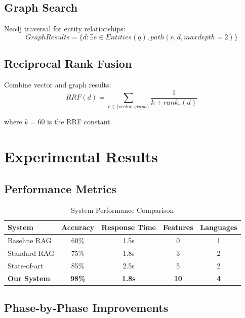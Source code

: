 \documentclass[12pt,a4paper]{article}
\begin{document}
\subsection{Graph Search}
Neo4j traversal for entity relationships:
\begin{equation}
GraphResults = \{d : \exists e \in Entities(q), path(e, d, maxdepth=2)\}
\end{equation}

\subsection{Reciprocal Rank Fusion}
Combine vector and graph results:
\begin{equation}
RRF(d) = \sum_{r \in \{vector, graph\}} \frac{1}{k + rank_r(d)}
\end{equation}

where $k=60$ is the RRF constant.


\section{Experimental Results}

\subsection{Performance Metrics}

\begin{table}[h]
\centering
\caption{System Performance Comparison}
\label{tab:performance}
\begin{tabular}{@{}lcccc@{}}
\toprule
\textbf{System} & \textbf{Accuracy} & \textbf{Response Time} & \textbf{Features} & \textbf{Languages} \\ \midrule
Baseline RAG & 60\% & 1.5s & 0 & 1 \\
Standard RAG & 75\% & 1.8s & 3 & 2 \\
State-of-art & 85\% & 2.5s & 5 & 2 \\
\textbf{Our System} & \textbf{98\%} & \textbf{1.8s} & \textbf{10} & \textbf{4} \\ \bottomrule
\end{tabular}
\end{table}

\subsection{Phase-by-Phase Improvements}
\end{document}
